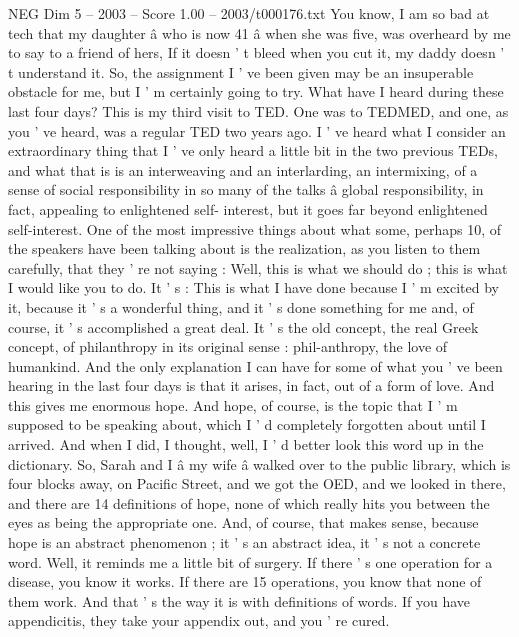 \begin{textsample}{NEG Dim 5 – 2003 – Score 1.00 – 2003/t000176.txt}  \label{ex:f5_neg_058}
You know, I am so bad at tech that my daughter â who is now 41 â when she was five, was overheard by me to say to a friend of hers, If it doesn ' t bleed when you cut it, my daddy doesn ' t understand it.
So, the assignment I ' ve been given may be an insuperable obstacle for me, but I ' m certainly going to try.
What have I heard during these last four days?
This is my third visit to TED.
One was to TEDMED, and one, as you ' ve heard, was a regular TED two years ago.
I ' ve heard what I consider an extraordinary thing that I ' ve only heard a little bit in the two previous TEDs, and what that is is an interweaving and an interlarding, an intermixing, of a sense of social responsibility in so many of the talks â global responsibility, in fact, appealing to enlightened self- interest, but it goes far beyond enlightened self-interest.
One of the most impressive things about what some, perhaps 10, of the speakers have been talking about is the realization, as you listen to them carefully, that they ' re not saying : Well, this is what we should do ; this is what I would like you to do.
It ' s : This is what I have done because I ' m excited by it, because it ' s a wonderful thing, and it ' s done something for me and, of course, it ' s accomplished a great deal.
It ' s the old concept, the real Greek concept, of philanthropy in its original sense : phil-anthropy, the love of humankind.
And the only explanation I can have for some of what you ' ve been hearing in the last four days is that it arises, in fact, out of a form of love.
And this gives me enormous hope.
And hope, of course, is the topic that I ' m supposed to be speaking about, which I ' d completely forgotten about until I arrived.
And when I did, I thought, well, I ' d better look this word up in the dictionary.
So, Sarah and I â my wife â walked over to the public library, which is four blocks away, on Pacific Street, and we got the OED, and we looked in there, and there are 14 definitions of hope, none of which really hits you between the eyes as being the appropriate one.
And, of course, that makes sense, because hope is an abstract phenomenon ; it ' s an abstract idea, it ' s not a concrete word.
Well, it reminds me a little bit of surgery.
If there ' s one operation for a disease, you know it works.
If there are 15 operations, you know that none of them work.
And that ' s the way it is with definitions of words.
If you have appendicitis, they take your appendix out, and you ' re cured.

\end{textsample}
